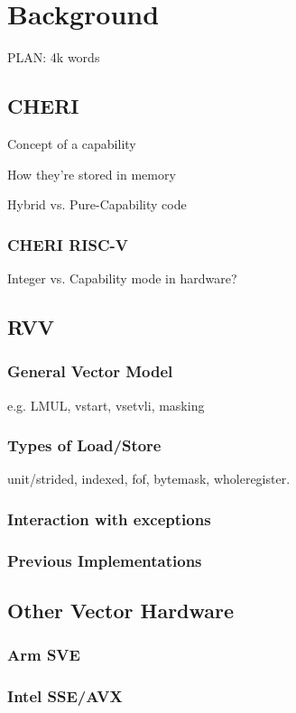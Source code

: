 \chapter{Background}
PLAN: 4k words


\section{CHERI}
Concept of a capability

How they're stored in memory

Hybrid vs. Pure-Capability code

\subsection{CHERI RISC-V}
Integer vs. Capability mode in hardware?

\section{RVV}
\subsection{General Vector Model}
e.g. LMUL, vstart, vsetvli, masking

\subsection{Types of Load/Store}
unit/strided,
indexed,
fof,
bytemask,
wholeregister.

\subsection{Interaction with exceptions}

\subsection{Previous Implementations}

\section{Other Vector Hardware}
\subsection{Arm SVE}
\subsection{Intel SSE/AVX}
